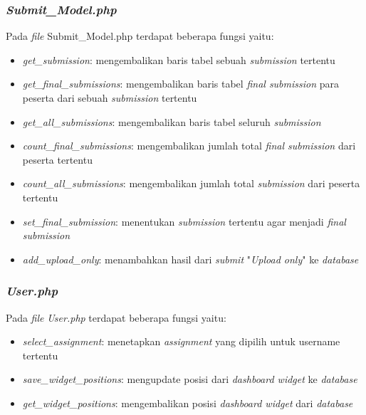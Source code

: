 \subsubsection{\textit{Submit\_Model.php}}
Pada \textit{file} Submit\_Model.php terdapat beberapa fungsi yaitu:
\begin{itemize}
	\item \textit{get\_submission}: mengembalikan baris tabel sebuah \textit{submission} tertentu 
	\item \textit{get\_final\_submissions}: mengembalikan baris tabel \textit{final submission} para peserta dari sebuah \textit{submission} tertentu
	\item \textit{get\_all\_submissions}: mengembalikan baris tabel seluruh \textit{submission}
	\item \textit{count\_final\_submissions}: mengembalikan jumlah total \textit{final submission} dari peserta tertentu
	\item \textit{count\_all\_submissions}: mengembalikan jumlah total \textit{submission} dari peserta tertentu
	\item \textit{set\_final\_submission}: menentukan \textit{submission} tertentu agar menjadi \textit{final submission}
	\item \textit{add\_upload\_only}: menambahkan hasil dari \textit{submit} "\textit{Upload only}" ke \textit{database}
\end{itemize}

\subsubsection{\textit{User.php}}
Pada \textit{file} \textit{User.php} terdapat beberapa fungsi yaitu:
\begin{itemize}
	\item \textit{select\_assignment}: menetapkan \textit{assignment} yang dipilih untuk username tertentu
	\item \textit{save\_widget\_positions}: mengupdate posisi dari \textit{dashboard widget} ke \textit{database}
	\item \textit{get\_widget\_positions}: mengembalikan posisi \textit{dashboard widget} dari \textit{database}
\end{itemize}

